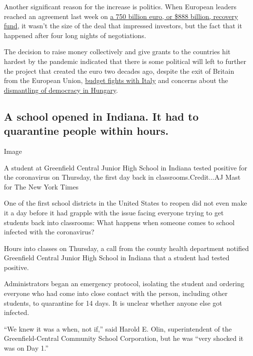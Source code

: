 Another significant reason for the increase is politics. When European
leaders reached an agreement last week on
\href{https://www.nytimes3xbfgragh.onion/2020/07/20/world/europe/eu-stimulus-coronavirus.html}{a
750 billion euro, or \$888 billion, recovery fund}, it wasn't the size
of the deal that impressed investors, but the fact that it happened
after four long nights of negotiations.

The decision to raise money collectively and give grants to the
countries hit hardest by the pandemic indicated that there is some
political will left to further the project that created the euro two
decades ago, despite the exit of Britain from the European Union,
\href{https://www.ft.com/content/92ec7bc4-9d8f-11e9-9c06-a4640c9feebb}{budget
fights with Italy} and concerns about the
\href{https://www.nytimes3xbfgragh.onion/2020/06/16/world/europe/hungary-coronavirus-orban.html}{dismantling
of democracy in Hungary}.

\hypertarget{a-school-opened-in-indiana-it-had-to-quarantine-people-within-hours}{%
\subsection{A school opened in Indiana. It had to quarantine people
within
hours.}\label{a-school-opened-in-indiana-it-had-to-quarantine-people-within-hours}}

Image

A student at Greenfield Central Junior High School in Indiana tested
positive for the coronavirus on Thursday, the first day back in
classrooms.Credit...AJ Mast for The New York Times

One of the first school districts in the United States to reopen did not
even make it a day before it had grapple with the issue facing everyone
trying to get students back into classrooms: What happens when someone
comes to school infected with the coronavirus?

Hours into classes on Thursday, a call from the county health department
notified Greenfield Central Junior High School in Indiana that a student
had tested positive.

Administrators began an emergency protocol, isolating the student and
ordering everyone who had come into close contact with the person,
including other students, to quarantine for 14 days. It is unclear
whether anyone else got infected.

``We knew it was a when, not if,'' said Harold E. Olin, superintendent
of the Greenfield-Central Community School Corporation, but he was
``very shocked it was on Day 1.''

